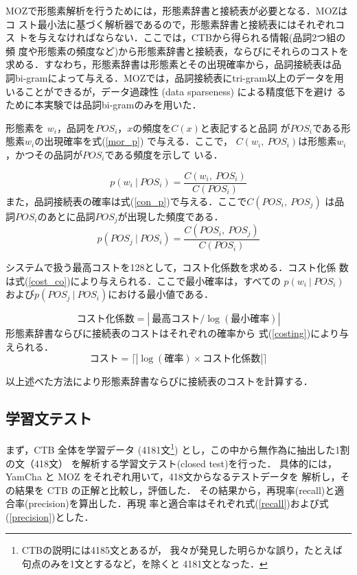 MOZで形態素解析を行うためには，形態素辞書と接続表が必要となる．MOZはコ
スト最小法に基づく解析器であるので，形態素辞書と接続表にはそれぞれコス
トを与えなければならない．ここでは，CTBから得られる情報(品詞2つ組の頻
度や形態素の頻度など)から形態素辞書と接続表，ならびにそれらのコストを
求める．すなわち，形態素辞書は形態素とその出現確率から，品詞接続表は品
詞bi-gramによって与える．MOZでは，品詞接続表にtri-gram以上のデータを用
いることができるが，データ過疎性 (data sparseness) による精度低下を避け
るために本実験では品詞bi-gramのみを用いた．

形態素を $w_i$，品詞を$POS_i$，$x$の頻度を$C(x)$と表記すると品詞
が$POS_i$である形態素$w_i$の出現確率を式(\ref{mor_p}) で与える．ここで，
$C(w_i,\ POS_i)$は形態素$w_i$，かつその品詞が$POS_i$である頻度を示して
いる．

\begin{equation}
 p(w_i\ |\ POS_i) = \frac{C(w_i,\ POS_i)}{C(POS_i)} 
\label{mor_p}
\end{equation}
また，品詞接続表の確率は式(\ref{con_p})で与える．ここで$C(POS_i,\ POS_j)$
は品詞$POS_i$のあとに品詞$POS_j$が出現した頻度である．
\begin{equation}
p(POS_j\ |\ POS_i) = \frac{C(POS_i,\ POS_j)}{C(POS_i)}
 \label{con_p}
\end{equation}

システムで扱う最高コストを128として，コスト化係数を求める．コスト化係
数は式(\ref{cost_co})により与えられる．ここで最小確率は，すべての
$p(w_i\ |\ POS_i)$および$p(POS_j\ |\ POS_i)$における最小値である．

\begin{equation}
 コスト化係数 = |\ 最高コスト / \log(最小確率)|
\label{cost_co}
\end{equation}
形態素辞書ならびに接続表のコストはそれぞれの確率から
式(\ref{costing})により与えられる．
\begin{equation}
コスト= \big\lceil | \log(確率) \times コスト化係数|\big\rceil
 \label{costing}
\end{equation}

以上述べた方法により形態素辞書ならびに接続表のコストを計算する．


\subsection{学習文テスト}
まず，CTB 全体を学習データ (4181文\footnote{CTBの説明には4185文とあるが，
我々が発見した明らかな誤り，たとえば句点のみを1文とするなど，を除くと
4181文となった．})
とし，この中から無作為に抽出した1割
の文（418文） を解析する学習文テスト(closed test)を行った．
具体的には，YamCha と MOZ をそれぞれ用いて，418文からなるテストデータを
解析し，その結果を CTB の正解と比較し，評価した．
その結果から，再現率(recall)と適合率(precision)を算出した．再現
率と適合率はそれぞれ式(\ref{recall})および式(\ref{precision})とした．

